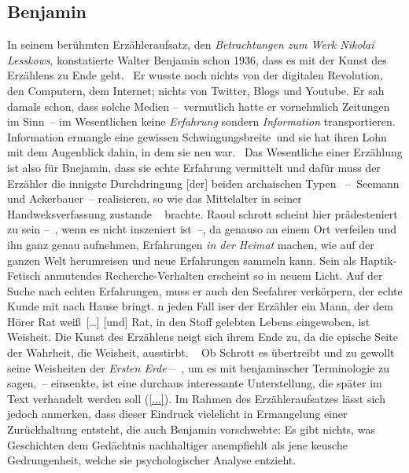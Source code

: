 \subsection{Benjamin}
In seinem berühmten Erzähleraufsatz, den \emph{Betrachtungen zum Werk Nikolai
  Lesskows}, konstatierte Walter Benjamin schon 1936, dass \glqq es mit der
  Kunst des Erzählens zu Ende geht.\grqq\ \citep[S. 385]{Benjamin1936Erzaehler}
Er wusste noch nichts von der digitalen Revolution, den Computern, dem
  Internet; nichts von Twitter, Blogs und Youtube.
Er sah damals schon, dass solche Medien --~vermutlich hatte er vornehmlich
  Zeitungen im Sinn~-- im Wesentlichen keine \emph{Erfahrung} sondern
  \emph{Information} transportieren.
Information ermangle eine gewissen \glqq Schwingungsbreite\grqq\ und sie
  \glqq hat ihren Lohn mit dem Augenblick dahin, in dem sie neu
  war.\grqq\ \citep[beide S. 391]{Benjamin1936Erzaehler}
Das Wesentliche einer Erzählung ist also für Bnejamin, dass sie echte Erfahrung
  vermittelt und dafür muss der Erzähler die \glqq innigste Durchdringung [der]
  beiden archaischen Typen\grqq\ \citep[S. 386]{Benjamin1936Erzaehler}
  --~Seemann und Ackerbauer~-- realisieren, so wie \glqq das Mittelalter in
  seiner Handweksverfassung zustande \grqq\ \citep[ebd.]{Benjamin1936Erzaehler} brachte.
Raoul schrott scheint hier prädesteniert zu sein --~, wenn es nicht inszeniert
  ist~--, da genauso an einem Ort verfeilen und ihn ganz genau aufnehmen,
  Erfahrungen \emph{in der Heimat} machen, wie auf der ganzen Welt
  herumreisen und neue Erfahrungen sammeln kann.
Sein als Haptik-Fetisch anmutendes Recherche-Verhalten erscheint so in neuem
  Licht.
Auf der Suche nach echten Erfahrungen, muss er auch den Seefahrer verkörpern,
  der echte Kunde mit nach Hause bringt.
\glqq [I]n jeden Fall iser der Erzähler ein Mann, der dem Hörer Rat
  wei\ss\ [\ldots] [und] Rat, in den Stoff gelebten Lebens eingewoben, ist Weisheit.
  Die Kunst des Erzählens neigt sich ihrem Ende zu, da die epische Seite der
  Wahrheit, die Weisheit, ausstirbt. \grqq\ \citep[S. 388]{Benjamin1936Erzaehler}
Ob Schrott es übertreibt und zu gewollt seine Weisheiten der \emph{Ersten
  Erde} --~, um es mit benjaminscher Terminologie zu sagen,~-- einsenkte,
  ist eine durchaus interessante Unterstellung, die später im Text verhandelt
  werden soll (\ref{...}).
Im Rahmen des Erzähleraufsatzes lässt sich jedoch anmerken, dass dieser
  Eindruck vielelicht in Ermangelung einer Zurückhaltung entsteht, die auch
  Benjamin vorschwebte:
\glqq Es gibt nichts, was Geschichten dem Gedächtnis nachhaltiger anempfiehlt
  als jene keusche Gedrungenheit, welche sie psychologischer Analyse
  entzieht.\grqq\ \citep[S. 392]{Benjamin1936Erzaehler}


